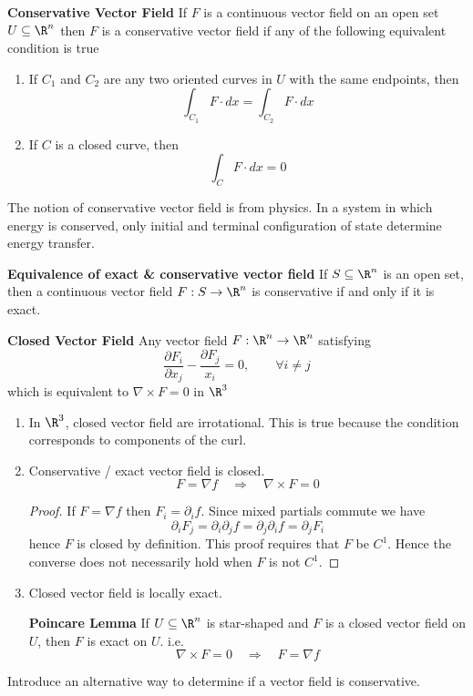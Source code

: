 \documentclass[11pt]{article}
\begin{document}
\begin{defn*}
  \textbf{Conservative Vector Field} If $F$ is a continuous vector field on an open set $U\subseteq\R^n$ then $F$ is a conservative vector field if any of the following equivalent condition is true
  \begin{enumerate}
    \item If $C_1$ and $C_2$ are any two oriented curves in $U$ with the same endpoints, then
    \[
      \int_{C_1} F\cdot dx = \int_{C_2}F\cdot dx
    \]
    \item If $C$ is a closed curve, then
    \[
      \int_C F\cdot dx = 0
    \]
  \end{enumerate}
  The notion of conservative vector field is from physics. In a system in which energy is conserved, only initial and terminal configuration of state determine energy transfer.
\end{defn*}

\begin{theorem*}
  \textbf{Equivalence of exact \& conservative vector field} If $S\subseteq\R^n$ is an open set, then a continuous vector field $F:S\to \R^n$ is conservative if and only if it is exact.
\end{theorem*}

\begin{defn*}
  \textbf{Closed Vector Field} Any vector field $F:\R^n \to\R^n$ satisfying
  \[
    \frac{\partial F_i}{\partial x_j} - \frac{\partial F_j}{x_i} = 0, \quad\quad \forall i \neq j
  \]
  which is equivalent to $\nabla \times F = 0$ in $\R^3$
  \begin{enumerate}
    \item In $\R^3$, closed vector field are irrotational. This is true because the condition corresponds to components of the curl.
    \item Conservative / exact vector field is closed.
    \[
      F = \nabla f \quad \Rightarrow \quad \nabla \times F = 0
    \]
    \begin{proof}
      If $F = \nabla f$ then $F_i = \partial_i f$. Since mixed partials commute we have
      \[
        \partial_i F_j = \partial_i \partial_j f = \partial_j \partial_i f = \partial_j F_i
      \]
      hence $F$ is closed by definition. This proof requires that $F$ be $C^1$. Hence the converse does not necessarily hold when $F$ is not $C^1$.
    \end{proof}
    \item Closed vector field is locally exact.

    \begin{theorem*}
      \textbf{Poincare Lemma} If $U\subseteq\R^n$ is star-shaped and $F$ is a closed vector field on $U$, then $F$ is exact on $U$. i.e.
      \[
        \nabla \times F = 0 \quad \Rightarrow\quad  F = \nabla f
      \]
    \end{theorem*}


  \end{enumerate}
  \begin{rem}
    Introduce an alternative way to determine if a vector field is conservative.
  \end{rem}
\end{defn*}
\end{document}
